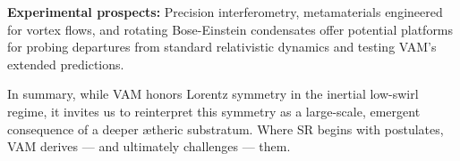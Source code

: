 \documentclass[11pt]{article}
\begin{document}
    \textbf{Experimental prospects:} Precision interferometry, metamaterials engineered for vortex flows, and rotating Bose-Einstein condensates offer potential platforms for probing departures from standard relativistic dynamics and testing VAM’s extended predictions.

    In summary, while VAM honors Lorentz symmetry in the inertial low-swirl regime, it invites us to reinterpret this symmetry as a large-scale, emergent consequence of a deeper ætheric substratum. Where SR begins with postulates, VAM derives — and ultimately challenges — them.



    \ifdefined\standalonechapter\else
    
    
\end{document}
